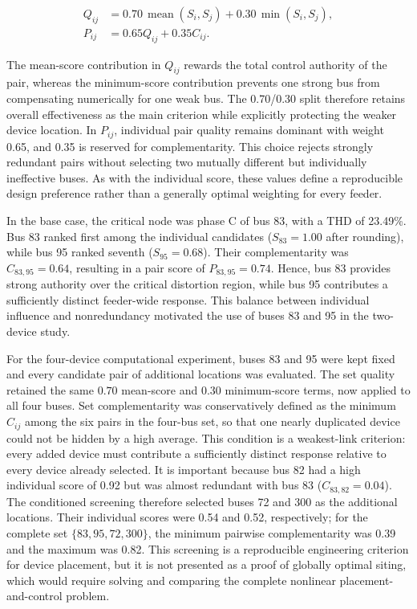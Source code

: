 \documentclass[journal]{IEEEtran}
\begin{document}
\begin{equation}
\begin{aligned}
Q_{ij}&=0.70\,\operatorname{mean}(S_i,S_j)
       +0.30\,\min(S_i,S_j),\\
P_{ij}&=0.65Q_{ij}+0.35C_{ij}.
\end{aligned}
\label{eq:svc_location_pair_score}
\end{equation}

The mean-score contribution in $Q_{ij}$ rewards the total control authority
of the pair, whereas the minimum-score contribution prevents one strong bus
from compensating numerically for one weak bus. The 0.70/0.30 split therefore
retains overall effectiveness as the main criterion while explicitly
protecting the weaker device location. In $P_{ij}$, individual pair quality
remains dominant with weight 0.65, and 0.35 is reserved for complementarity.
This choice rejects strongly redundant pairs without selecting two mutually
different but individually ineffective buses. As with the individual score,
these values define a reproducible design preference rather than a generally
optimal weighting for every feeder.

In the base case, the critical node was phase C of bus 83, with a THD of
23.49\%. Bus 83 ranked first among the individual candidates
($S_{83}=1.00$ after rounding), while bus 95 ranked seventh
($S_{95}=0.68$). Their complementarity was $C_{83,95}=0.64$, resulting in a
pair score of $P_{83,95}=0.74$. Hence, bus 83 provides strong authority over
the critical distortion region, while bus 95 contributes a sufficiently
distinct feeder-wide response. This balance between individual influence and
nonredundancy motivated the use of buses 83 and 95 in the two-device study.

For the four-device computational experiment, buses 83 and 95 were kept fixed
and every candidate pair of additional locations was evaluated. The set
quality retained the same $0.70$ mean-score and $0.30$ minimum-score terms,
now applied to all four buses. Set complementarity was conservatively defined
as the minimum $C_{ij}$ among the six pairs in the four-bus set, so that one
nearly duplicated device could not be hidden by a high average. This condition
is a weakest-link criterion: every added device must contribute a sufficiently
distinct response relative to every device already selected. It is important
because bus 82 had a high individual score of 0.92 but was almost
redundant with bus 83 ($C_{83,82}=0.04$). The conditioned screening therefore
selected buses 72 and 300 as the additional locations. Their individual scores
were 0.54 and 0.52, respectively; for the complete set
$\{83,95,72,300\}$, the minimum pairwise complementarity was 0.39 and the
maximum was 0.82. This screening is a reproducible engineering criterion for
device placement, but it is not presented as a proof of globally optimal
siting, which would require solving and comparing the complete nonlinear
placement-and-control problem.
\end{document}
